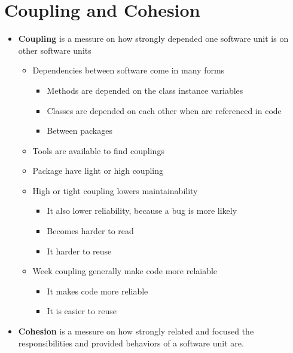 \documentclass[11pt]{article}
\providecommand{\tightlist}{%
      \setlength{\itemsep}{0pt}\setlength{\parskip}{0pt}}
\begin{document}
    \hypertarget{coupling-and-cohesion}{%
\section{Coupling and Cohesion}\label{coupling-and-cohesion}}

\begin{itemize}
\tightlist
\item
  \textbf{Coupling} is a messure on how strongly depended one software
  unit is on other software units

  \begin{itemize}
  \tightlist
  \item
    Dependencies between software come in many forms

    \begin{itemize}
    \tightlist
    \item
      Methods are depended on the class instance variables
    \item
      Classes are depended on each other when are referenced in code
    \item
      Between packages
    \end{itemize}
  \item
    Tools are available to find couplings
  \item
    Package have light or high coupling
  \item
    High or tight coupling lowers maintainability

    \begin{itemize}
    \tightlist
    \item
      It also lower reliability, because a bug is more likely
    \item
      Becomes harder to read
    \item
      It harder to reuse
    \end{itemize}
  \item
    Week coupling generally make code more relaiable

    \begin{itemize}
    \tightlist
    \item
      It makes code more reliable
    \item
      It is easier to reuse
    \end{itemize}
  \end{itemize}
\item
  \textbf{Cohesion} is a messure on how strongly related and focused the
  responsibilities and provided behaviors of a software unit are.


\end{itemize}
\end{document}
